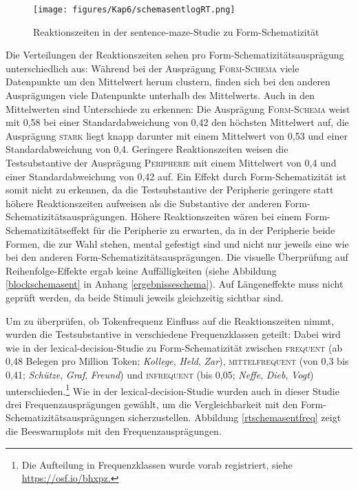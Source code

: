 \begin{figure}
\texttt{[image: figures/Kap6/schemasentlogRT.png]} 
\caption{Reaktionszeiten in der sentence-maze-Studie zu Form-Schematizität}
\label{rtschemasent}
\end{figure}


Die Verteilungen der Reaktionszeiten sehen pro Form-Sche\-ma\-ti\-zi\-täts\-aus\-prä\-gung unterschiedlich aus: Während bei der Ausprägung \textsc{Form-Schema} viele Datenpunkte um den Mittelwert herum clustern, finden sich bei den anderen Ausprägungen viele Datenpunkte unterhalb des Mittelwerts. Auch in den Mittelwerten sind Unterschiede zu erkennen: Die Ausprägung \textsc{Form-Schema} weist mit 0,58 bei einer Standardabweichung von 0,42 den höchsten Mittelwert auf, die Ausprägung \textsc{stark} liegt knapp darunter mit einem Mittelwert von 0,53 und einer Standardabweichung von 0,4. Geringere Reaktionszeiten weisen die Testsubstantive der Ausprägung \textsc{Peripherie} mit einem Mittelwert von 0,4 und einer Standardabweichung von 0,42 auf. Ein Effekt durch Form-Schematizität ist somit nicht zu erkennen, da die Testsubstantive der Peripherie geringere statt höhere Reaktionszeiten aufweisen als die Substantive der anderen Form-Sche\-ma\-ti\-zi\-täts\-aus\-prä\-gun\-gen. Höhere Reaktionszeiten wären bei einem Form-Sche\-ma\-ti\-zi\-täts\-ef\-fekt für die Peripherie zu erwarten, da in der Peripherie beide Formen, die zur Wahl stehen, mental gefestigt sind und nicht nur jeweils eine wie bei den anderen Form-Sche\-ma\-ti\-zi\-täts\-aus\-prä\-gun\-gen. Die visuelle Überprüfung auf Reihenfolge-Effekte ergab keine Auffälligkeiten (siehe Abbildung \ref{blockschemasent} in Anhang \ref{ergebnisseschema}). Auf Längeneffekte muss nicht geprüft werden, da beide Stimuli jeweils gleichzeitig sichtbar sind.\largerpage

Um zu überprüfen, ob Tokenfrequenz Einfluss auf die Reaktionszeiten nimmt, wurden die Testsubstantive in verschiedene Frequenzklassen geteilt: Dabei wird wie in der lexical-decision-Studie zu Form-Schematizität zwischen \textsc{frequent} (ab 0,48 Belegen pro Million Token; \textit{Kollege}, \textit{Held}, \textit{Zar}), \textsc{mittelfrequent} (von 0,3 bis 0,41; \textit{Schütze}, \textit{Graf}, \textit{Freund}) und \textsc{infrequent} (bis 0,05; \textit{Neffe}, \textit{Dieb}, \textit{Vogt}) unterschieden.\footnote{Die Aufteilung in Frequenzklassen wurde vorab registriert, siehe \url{https://osf.io/bhxpz.}} Wie in der lexical-decision-Studie wurden auch in dieser Studie drei Frequenzausprägungen gewählt, um die Vergleichbarkeit mit den Form-Schematizitätsausprägungen sicherzustellen. Abbildung \ref{rtschemasentfreq} zeigt die Beeswarmplots mit den Frequenzausprägungen.

